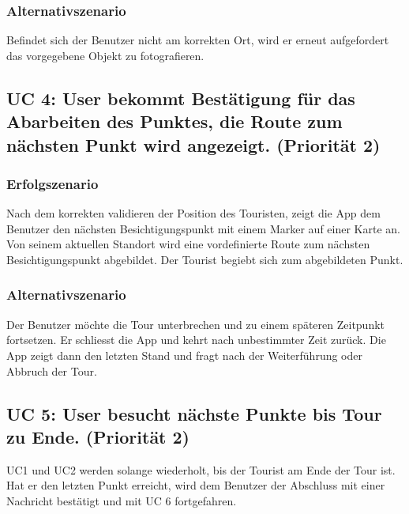 \documentclass[ngerman,]{article}
\begin{document}
\subsubsection{Alternativszenario}\label{alternativszenario}

Befindet sich der Benutzer nicht am korrekten Ort, wird er erneut
aufgefordert das vorgegebene Objekt zu fotografieren.

\subsection{UC 4: User bekommt Bestätigung für das Abarbeiten des
Punktes, die Route zum nächsten Punkt wird angezeigt. (Priorität
2)}\label{uc-4-user-bekommt-bestuxe4tigung-fuxfcr-das-abarbeiten-des-punktes-die-route-zum-nuxe4chsten-punkt-wird-angezeigt.-priorituxe4t-2}

\subsubsection{Erfolgszenario}\label{erfolgszenario-2}

Nach dem korrekten validieren der Position des Touristen, zeigt die App
dem Benutzer den nächsten Besichtigungspunkt mit einem Marker auf einer
Karte an. Von seinem aktuellen Standort wird eine vordefinierte Route
zum nächsten Besichtigungspunkt abgebildet. Der Tourist begiebt sich zum
abgebildeten Punkt.

\subsubsection{Alternativszenario}\label{alternativszenario-1}

Der Benutzer möchte die Tour unterbrechen und zu einem späteren
Zeitpunkt fortsetzen. Er schliesst die App und kehrt nach unbestimmter
Zeit zurück. Die App zeigt dann den letzten Stand und fragt nach der
Weiterführung oder Abbruch der Tour.

\subsection{UC 5: User besucht nächste Punkte bis Tour zu Ende.
(Priorität
2)}\label{uc-5-user-besucht-nuxe4chste-punkte-bis-tour-zu-ende.-priorituxe4t-2}

UC1 und UC2 werden solange wiederholt, bis der Tourist am Ende der Tour
ist. Hat er den letzten Punkt erreicht, wird dem Benutzer der Abschluss
mit einer Nachricht bestätigt und mit UC 6 fortgefahren.
\end{document}
